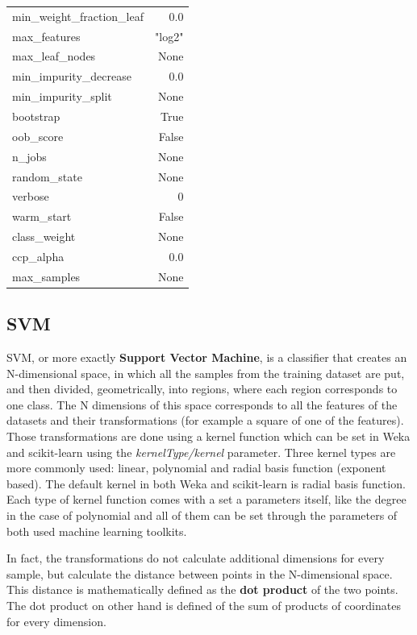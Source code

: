\begin{table}[H]
\begin{subtable}[t]{.5\linewidth}
\begin{tabular}{lr}
            min\_weight\_fraction\_leaf & 0.0 \\
            max\_features & "log2" \\
            max\_leaf\_nodes & None \\
            min\_impurity\_decrease & 0.0 \\
            min\_impurity\_split & None \\
            bootstrap & True \\
            oob\_score & False \\
            n\_jobs & None \\
            random\_state & None \\
            verbose & 0 \\
            warm\_start & False \\
            class\_weight & None \\
            ccp\_alpha & 0.0 \\
            max\_samples & None \\\bottomrule
        \end{tabular}
    \end{subtable}%
\end{table}

\subsection{SVM}

SVM, or more exactly \textbf{Support Vector Machine}, is a classifier that creates an N-dimensional space, in which all the samples from the training dataset are put, and then divided, geometrically, into regions, where each region corresponds to one class. The N dimensions of this space corresponds to all the features of the datasets and their transformations (for example a square of one of the features). Those transformations are done using a kernel function which can be set in Weka and scikit-learn using the \textit{kernelType/kernel} parameter. Three kernel types are more commonly used: linear, polynomial and radial basis function (exponent based). The default kernel in both Weka and scikit-learn is radial basis function. Each type of kernel function comes with a set a parameters itself, like the degree in the case of polynomial and all of them can be set through the parameters of both used machine learning toolkits.

In fact, the transformations do not calculate additional dimensions for every sample, but calculate the distance between points in the N-dimensional space. This distance is mathematically defined as the \textbf{dot product} of the two points. The dot product on other hand is defined of the sum of products of coordinates for every dimension. 

